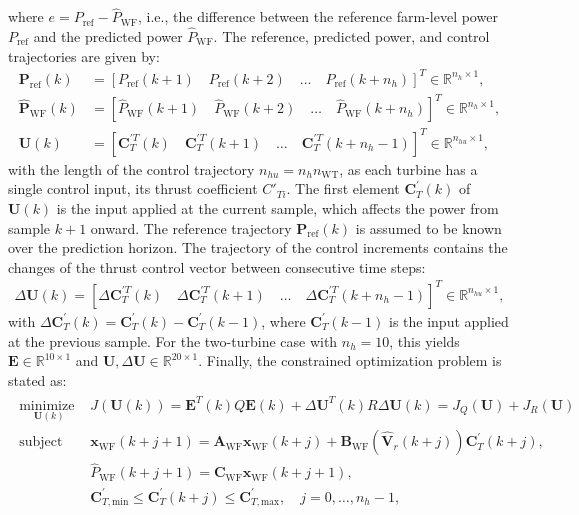where $e = P_{\text{ref}} - \hat{P}_{\text{WF}}$, i.e., the difference between the reference farm-level power $P_{\text{ref}}$ and the predicted power $\hat{P}_{\text{WF}}$. The reference, predicted power, and control trajectories are given by:
\begin{equation} \label{eq:UandDUAIC}
    \begin{aligned}
        \bm{P}_{\text{ref}}(k) &= [ P_{\text{ref}}(k+1) \quad P_{\text{ref}}(k+2) \quad \dots \quad P_{\text{ref}}(k + n_h)]^T \in \mathbb{R}^{n_h \times 1}, \\
        \hat{\bm{P}}_{\text{WF}}(k) &= [ \hat{P}_{\text{WF}}(k+1) \quad \hat{P}_{\text{WF}}(k+2) \quad \dots \quad \hat{P}_{\text{WF}}(k + n_h)]^T \in \mathbb{R}^{n_h \times 1}, \\
        \bm{U}(k) &= [ \bm{C}_T^{\prime T}(k) \quad \bm{C}_T^{\prime T}(k+1) \quad \dots \quad \bm{C}_T^{\prime T}(k+n_h-1) ]^T \in \mathbb{R}^{n_{hu}\times 1},
    \end{aligned}
\end{equation}
with the length of the control trajectory $n_{hu} = n_h n_{\text{WT}}$, as each turbine has a single control input, its thrust coefficient $C'_{Ti}$. The first element $\bm{C}_T^\prime(k)$ of $\bm{U}(k)$ is the input applied at the current sample, which affects the power from sample $k+1$ onward. The reference trajectory $\bm{P}_{\text{ref}}(k)$ is assumed to be known over the prediction horizon. The trajectory of the control increments contains the changes of the thrust control vector between consecutive time steps:
\begin{align} \label{eq:DUAIC}
    \Delta \bm{U}(k) = [ \Delta\bm{C}_T^{\prime T}(k) \quad \Delta\bm{C}_T^{\prime T}(k+1) \quad \dots \quad \Delta\bm{C}_T^{\prime T}(k+n_h-1) ]^T \in \mathbb{R}^{n_{hu}\times 1},
\end{align}
with $\Delta\bm{C}_T^\prime(k) = \bm{C}_T^\prime(k) - \bm{C}_T^\prime(k-1)$, where $\bm{C}_T^\prime(k-1)$ is the input applied at the previous sample. For the two-turbine case with $n_h = 10$, this yields $\bm{E} \in \mathbb{R}^{10\times 1}$ and $\bm{U}, \Delta \bm{U} \in \mathbb{R}^{20\times 1}$. Finally, the constrained optimization problem is stated as:
\begin{align} \label{eq:ObjFunAIC}
    \begin{array}{ll}
        \underset{\bm{U}(k)}{\text{minimize }} & J(\bm{U}(k)) = \bm{E}^T(k) Q \bm{E}(k) + \Delta \bm{U}^T(k) R \Delta \bm{U}(k) = J_Q(\bm{U}) + J_R(\bm{U}) \\[10pt]
        \text{subject to} & \bm{x}_{\text{WF}}(k+j+1) = \bm{A}_{\text{WF}} \bm{x}_{\text{WF}}(k+j) + \bm{B}_{\text{WF}}(\hat{\bm{V}}_r(k+j)) \bm{C}_{T}^\prime(k+j), \\[10pt]
        & \hat{P}_{\text{WF}}(k+j+1) = \bm{C}_{\text{WF}} \bm{x}_{\text{WF}}(k+j+1), \\[10pt]
        & \bm{C}_{T,\text{min}}^\prime \leq \bm{C}_{T}^\prime(k+j) \leq \bm{C}_{T,\text{max}}^\prime, \quad j = 0, \dots, n_h-1,
    \end{array}
\end{align}
